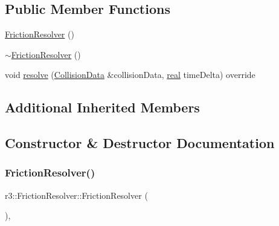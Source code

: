 \subsection*{Public Member Functions}
\begin{DoxyCompactItemize}
\item 
\mbox{\hyperlink{classr3_1_1_friction_resolver_a55a3a08603cf362da1896ec2ccc026ba}{Friction\+Resolver}} ()
\item 
\mbox{\hyperlink{classr3_1_1_friction_resolver_a49a41d6820e9c9c17447c79303296dea}{$\sim$\+Friction\+Resolver}} ()
\item 
void \mbox{\hyperlink{classr3_1_1_friction_resolver_af26a84959e95749088f713176ec3c096}{resolve}} (\mbox{\hyperlink{classr3_1_1_collision_data}{Collision\+Data}} \&collision\+Data, \mbox{\hyperlink{namespacer3_ab2016b3e3f743fb735afce242f0dc1eb}{real}} time\+Delta) override
\end{DoxyCompactItemize}
\subsection*{Additional Inherited Members}


\subsection{Constructor \& Destructor Documentation}
\mbox{\label{classr3_1_1_friction_resolver_a55a3a08603cf362da1896ec2ccc026ba}} 
\subsubsection{\texorpdfstring{Friction\+Resolver()}{FrictionResolver()}}
{\footnotesize\ttfamily r3\+::\+Friction\+Resolver\+::\+Friction\+Resolver (\begin{DoxyParamCaption}{ }\end{DoxyParamCaption})\hspace{0.3cm}{\ttfamily [explicit]}, {\ttfamily [default]}}

\mbox{\label{classr3_1_1_friction_resolver_a49a41d6820e9c9c17447c79303296dea}} 
